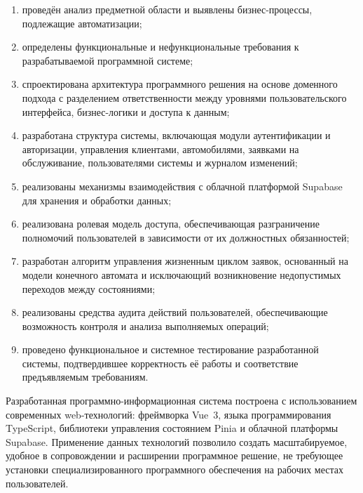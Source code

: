 \begin{enumerate}
	\item проведён анализ предметной области и выявлены бизнес-процессы, подлежащие автоматизации;
	
	\item определены функциональные и нефункциональные требования к разрабатываемой программной системе;
	
	\item спроектирована архитектура программного решения на основе доменного подхода с разделением ответственности между уровнями пользовательского интерфейса, бизнес-логики и доступа к данным;
	
	\item разработана структура системы, включающая модули аутентификации и авторизации, управления клиентами, автомобилями, заявками на обслуживание, пользователями системы и журналом изменений;
	
	\item реализованы механизмы взаимодействия с облачной платформой Supabase для хранения и обработки данных;
	
	\item реализована ролевая модель доступа, обеспечивающая разграничение полномочий пользователей в зависимости от их должностных обязанностей;
	
	\item разработан алгоритм управления жизненным циклом заявок, основанный на модели конечного автомата и исключающий возникновение недопустимых переходов между состояниями;
	
	\item реализованы средства аудита действий пользователей, обеспечивающие возможность контроля и анализа выполняемых операций;
	
	\item проведено функциональное и системное тестирование разработанной системы, подтвердившее корректность её работы и соответствие предъявляемым требованиям.
\end{enumerate}

Разработанная программно-информационная система построена с использованием современных web-технологий: фреймворка Vue~3, языка программирования TypeScript, библиотеки управления состоянием Pinia и облачной платформы Supabase. Применение данных технологий позволило создать масштабируемое, удобное в сопровождении и расширении программное решение, не требующее установки специализированного программного обеспечения на рабочих местах пользователей.

